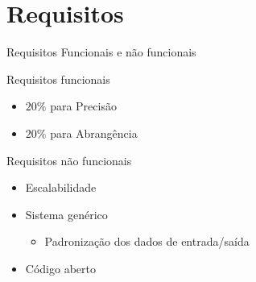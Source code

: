 \section[Requisitos]{Requisitos}
\begin{frame}{Requisitos} {Funcionais e não funcionais}
\begin{block}{Requisitos funcionais}
\begin{itemize}
	\item $20\%$ para Precisão
	\item $20\%$ para Abrangência
\end{itemize}
\end{block}

\begin{block}{Requisitos não funcionais}
\begin{itemize}
	\item Escalabilidade
	\item Sistema genérico
	\begin{itemize}
		\item Padronização dos dados de entrada/saída
	\end{itemize}
	\item Código aberto
\end{itemize}
\end{block}
\end{frame}

